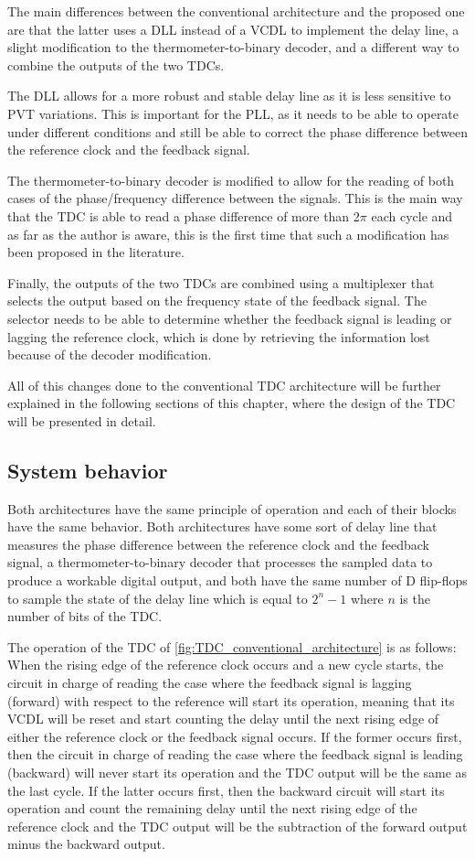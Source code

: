 The main differences between the conventional architecture and the proposed one are that the latter uses a DLL instead of a VCDL to implement the delay line, a slight modification
to the thermometer-to-binary decoder, and a different way to combine the outputs of the two TDCs.

The DLL allows for a more robust and stable delay line as it is less sensitive to PVT variations. This is important for the PLL, as it needs to be able to operate under different
conditions and still be able to correct the phase difference between the reference clock and the feedback signal.

The thermometer-to-binary decoder is modified to allow for the reading of both cases of the phase/frequency difference between the signals. This is the main way that the TDC is able
to read a phase difference of more than 2$\pi$ each cycle and as far as the author is aware, this is the first time that such a modification has been proposed in the literature.

Finally, the outputs of the two TDCs are combined using a multiplexer that selects the output based on the frequency state of the feedback signal. The selector needs to be able to
determine whether the feedback signal is leading or lagging the reference clock, which is done by retrieving the information lost because of the decoder modification.


All of this changes done to the conventional TDC architecture will be further explained in the following sections of this chapter, where the design of the TDC will be presented in 
detail.

\subsection{System behavior}
Both architectures have the same principle of operation and each of their blocks have the same behavior. Both architectures have some sort of delay line that measures the phase difference
between the reference clock and the feedback signal, a thermometer-to-binary decoder that processes the sampled data to produce a workable digital output, and both have the same number of 
D flip-flops to sample the state of the delay line which is equal to $2^n-1$ where $n$ is the number of bits of the TDC.

The operation of the TDC of \ref{fig:TDC_conventional_architecture} is as follows: When the rising edge of the reference clock occurs and a new cycle starts, the circuit in charge of reading the 
case where the feedback signal is lagging (forward) with respect to the reference will start its operation, meaning that its VCDL will be reset and start counting the delay until the next rising 
edge of either the reference clock or the feedback signal occurs. If the former occurs first, then the circuit in charge of reading the case where the feedback signal is leading (backward) will 
never start its operation and the TDC output will be the same as the last cycle. If the latter occurs first, then the backward circuit will start its operation and count the remaining delay until
the next rising edge of the reference clock and the TDC output will be the subtraction of the forward output minus the backward output.

